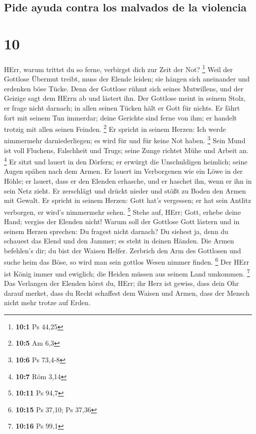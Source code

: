 \hypertarget{pide-ayuda-contra-los-malvados-de-la-violencia}{%
\subsection{Pide ayuda contra los malvados de la
violencia}\label{pide-ayuda-contra-los-malvados-de-la-violencia}}

\hypertarget{section-9}{%
\section{10}\label{section-9}}

 HErr, warum trittst du so ferne, verbirgst dich zur Zeit
der Not? \footnote{\textbf{10:1} Ps 44,25}  Weil der
Gottlose Übermut treibt, muss der Elende leiden; sie hängen sich
aneinander und erdenken böse Tücke.  Denn der Gottlose
rühmt sich seines Mutwillens, und der Geizige sagt dem HErrn ab und
lästert ihn.  Der Gottlose meint in seinem Stolz, er frage
nicht darnach; in allen seinen Tücken hält er Gott für nichts.
 Er fährt fort mit seinem Tun immerdar; deine Gerichte
sind ferne von ihm; er handelt trotzig mit allen seinen Feinden.
\footnote{\textbf{10:5} Am 6,3}  Er spricht in seinem
Herzen: Ich werde nimmermehr darniederliegen; es wird für und für keine
Not haben. \footnote{\textbf{10:6} Ps 73,4-8}  Sein Mund
ist voll Fluchens, Falschheit und Trugs; seine Zunge richtet Mühe und
Arbeit an. \footnote{\textbf{10:7} Röm 3,14}  Er sitzt und
lauert in den Dörfern; er erwürgt die Unschuldigen heimlich; seine Augen
spähen nach dem Armen.  Er lauert im Verborgenen wie ein
Löwe in der Höhle; er lauert, dass er den Elenden erhasche, und er
haschet ihn, wenn er ihn in sein Netz zieht.  Er
zerschlägt und drückt nieder und stößt zu Boden den Armen mit Gewalt.
 Er spricht in seinem Herzen: Gott hat's vergessen; er
hat sein Antlitz verborgen, er wird's nimmermehr sehen. \footnote{\textbf{10:11}
  Ps 94,7}  Stehe auf, HErr; Gott, erhebe deine Hand;
vergiss der Elenden nicht!  Warum soll der Gottlose Gott
lästern und in seinem Herzen sprechen: Du fragest nicht darnach?
 Du siehest ja, denn du schauest das Elend und den
Jammer; es steht in deinen Händen. Die Armen befehlen's dir; du bist der
Waisen Helfer.  Zerbrich den Arm des Gottlosen und suche
heim das Böse, so wird man sein gottlos Wesen nimmer finden. \footnote{\textbf{10:15}
  Ps 37,10; Ps 37,36}  Der HErr ist König immer und
ewiglich; die Heiden müssen aus seinem Land umkommen. \footnote{\textbf{10:16}
  Ps 99,1}  Das Verlangen der Elenden hörst du, HErr; ihr
Herz ist gewiss, dass dein Ohr darauf merket,  dass du
Recht schaffest dem Waisen und Armen, dass der Mensch nicht mehr trotze
auf Erden.

